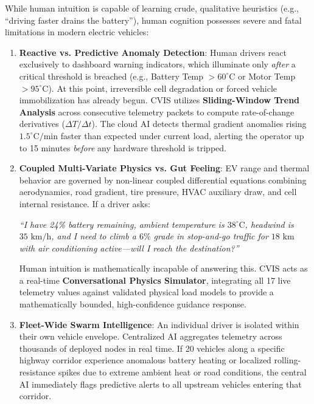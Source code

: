 \documentclass[12pt,a4paper]{report}
\begin{document}
While human intuition is capable of learning crude, qualitative heuristics (e.g., ``driving faster drains the battery''), human cognition possesses severe and fatal limitations in modern electric vehicles:

\begin{enumerate}[leftmargin=1.5cm]
  \item \textbf{Reactive vs. Predictive Anomaly Detection}: Human drivers react exclusively to dashboard warning indicators, which illuminate only \textit{after} a critical threshold is breached (e.g., Battery Temp $> 60^\circ\text{C}$ or Motor Temp $> 95^\circ\text{C}$). At this point, irreversible cell degradation or forced vehicle immobilization has already begun. CVIS utilizes \textbf{Sliding-Window Trend Analysis} across consecutive telemetry packets to compute rate-of-change derivatives ($\Delta T / \Delta t$). The cloud AI detects thermal gradient anomalies rising $1.5^\circ\text{C}/\text{min}$ faster than expected under current load, alerting the operator up to 15 minutes \textit{before} any hardware threshold is tripped.

  \item \textbf{Coupled Multi-Variate Physics vs. Gut Feeling}: EV range and thermal behavior are governed by non-linear coupled differential equations combining aerodynamics, road gradient, tire pressure, HVAC auxiliary draw, and cell internal resistance. If a driver asks:
  \begin{center}
  \textit{``I have 24\% battery remaining, ambient temperature is $38^\circ\text{C}$, headwind is $35\text{ km/h}$, and I need to climb a $6\%$ grade in stop-and-go traffic for $18\text{ km}$ with air conditioning active---will I reach the destination?''}
  \end{center}
  Human intuition is mathematically incapable of answering this. CVIS acts as a real-time \textbf{Conversational Physics Simulator}, integrating all 17 live telemetry values against validated physical load models to provide a mathematically bounded, high-confidence guidance response.

  \item \textbf{Fleet-Wide Swarm Intelligence}: An individual driver is isolated within their own vehicle envelope. Centralized AI aggregates telemetry across thousands of deployed nodes in real time. If 20 vehicles along a specific highway corridor experience anomalous battery heating or localized rolling-resistance spikes due to extreme ambient heat or road conditions, the central AI immediately flags predictive alerts to all upstream vehicles entering that corridor.
\end{enumerate}
\end{document}
